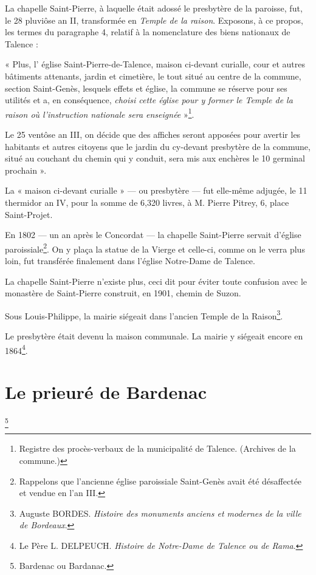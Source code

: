 La chapelle Saint-Pierre, à laquelle était adossé le presbytère de la paroisse, fut, le 28 pluviôse an II, transformée en \textit{Temple de la raison}. Exposons, à ce propos, les termes du paragraphe 4, relatif à la nomenclature des biens nationaux de Talence :

« Plus, l' église Saint-Pierre-de-Talence, maison ci-devant curialle, cour et autres bâtiments attenants, jardin et cimetière, le tout situé au centre de la commune, section Saint-Genès, lesquels effets et église, la commune se réserve pour ses utilités et a, en conséquence, \textit{choisi cette église pour y former le Temple de la raison où l'instruction nationale sera enseignée} »\footnote{Registre des procès-verbaux de la municipalité de Talence. (Archives de la commune.)}.

Le 25 ventôse an III, on décide que des affiches seront apposées pour avertir les habitants et autres citoyens que le jardin du cy-devant presbytère de la commune, situé au couchant du chemin qui y conduit, sera mis aux enchères le 10 germinal prochain ».

La « maison ci-devant curialle » — ou presbytère — fut elle-même adjugée, le 11 thermidor an IV, pour la somme de 6,320 livres, à M. Pierre Pitrey, 6, place Saint-Projet.

En 1802 — un an après le Concordat — la chapelle Saint-Pierre servait d'église paroissiale\footnote{Rappelons que l'ancienne église paroissiale Saint-Genès avait été désaffectée et vendue en l'an III.}. On y plaça la statue de la Vierge et celle-ci, comme on le verra plus loin, fut transférée finalement dans l'église Notre-Dame de Talence.

La chapelle Saint-Pierre n'existe plus, ceci dit pour éviter toute confusion avec le monastère de Saint-Pierre construit, en 1901, chemin de Suzon.

Sous Louis-Philippe, la mairie siégeait dans l'ancien Temple de la Raison\footnote{Auguste BORDES. \textit{Histoire des monuments anciens et modernes de la ville de Bordeaux}.}.

Le presbytère était devenu la maison communale. La mairie y siégeait encore en 1864\footnote{Le Père L. DELPEUCH. \textit{Histoire de Notre-Dame de Talence ou de Rama}.}.

\section{Le prieuré de Bardenac}\footnote{Bardenac ou Bardanac.}

